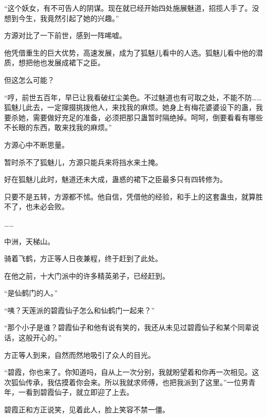 \begin{this_body}
“这个妖女，有不可告人的阴谋。现在就已经开始四处施展魅道，招揽人手了。没想到今生，我竟然引起了她的兴趣。”

方源对比了一下前世，感到一阵唏嘘。

他凭借重生的巨大优势，高速发展，成为了狐魅儿看中的人选。狐魅儿看中他的潜质，想把他也发展成裙下之臣。

但这怎么可能？

“哼，前世五百年，早已让我看破红尘美色。不过魅道也有可取之处，不能不防……狐魅儿此去，一定撺掇挑拨他人，来找我的麻烦。她身上有梅花婆婆设下的蛊，我要杀她，需要做好充足的准备，必须把那只蛊暂时隔绝掉。呵呵，倒要看看有哪些不长眼的东西，敢来找我的麻烦。”

方源心中不断思量。

暂时杀不了狐魅儿，方源只能兵来将挡水来土掩。

好在狐魅儿此时，魅道还未大成，蛊惑的裙下之臣最多只有四转修为。

只要不是五转，方源都不怵。他自信，凭借他的经验，和手上的这套蛊虫，就算胜不了，也未必会败。

……

中洲，天梯山。

骑着飞鹤，方正等人日夜兼程，终于赶到了此处。

在他之前，十大门派中的许多精英弟子，已经赶到。

“是仙鹤门的人。”

“咦？天莲派的碧霞仙子怎么和仙鹤门一起来？”

“那个小子是谁？碧霞仙子和他有说有笑的，我还从未见过碧霞仙子和某个同辈说话，这般开心的。”

方正等人到来，自然而然地吸引了众人的目光。

“碧霞，你也来了。你知道吗，自从上一次分别，我就盼望着和你再一次相见。这次狐仙传承，我估摸着你会来。所以我就求师傅，也把我派到了这里。”一位男青年，一看到碧霞仙子，就立即迎了上去。

碧霞正和方正说笑，见着此人，脸上笑容不禁一僵。

\end{this_body}


